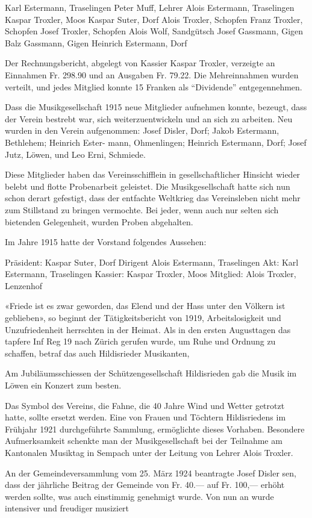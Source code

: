 \begin{multicols}{2}
    Karl Estermann, Traselingen
    Peter Muff, Lehrer
    Alois Estermann, Traselingen
    Kaspar Troxler, Moos
    Kaspar Suter, Dorf
    Alois Troxler, Schopfen
    Franz Troxler, Schopfen
    Josef Troxler, Schopfen
    Alois Wolf, Sandgütsch
    Josef Gassmann, Gigen
    Balz Gassmann, Gigen
    Heinrich Estermann, Dorf

    Der Rechnungsbericht, abgelegt von Kassier Kaspar
    Troxler, verzeigte an Einnahmen Fr. 298.90 und an
    Ausgaben Fr. 79.22. Die Mehreinnahmen wurden verteilt, und jedes Mitglied konnte 15 Franken als
    "`Dividende"' entgegennehmen.

    Dass die Musikgesellschaft 1915 neue Mitglieder aufnehmen konnte, bezeugt, dass der Verein bestrebt war,
    sich weiterzuentwickeln und an sich zu arbeiten.
    Neu wurden in den Verein aufgenommen: Josef Disler,
    Dorf; Jakob Estermann, Bethlehem; Heinrich Ester-
    mann, Ohmenlingen; Heinrich Estermann, Dorf; Josef
    Jutz, Löwen, und Leo Erni, Schmiede.

    Diese Mitglieder haben das Vereinsschifflein in gesellschaftlicher Hinsicht wieder
    belebt und flotte Probenarbeit geleistet. Die Musikgesellschaft hatte sich nun
    schon derart gefestigt, dass der entfachte Weltkrieg das
    Vereinsleben nicht mehr zum Stillstand zu bringen vermochte.
    Bei jeder, wenn auch nur selten sich bietenden
    Gelegenheit, wurden Proben abgehalten.

    Im Jahre 1915 hatte der Vorstand folgendes
    Aussehen:

    Präsident: Kaspar Suter, Dorf
    Dirigent Alois Estermann, Traselingen
    Akt: Karl Estermann, Traselingen
    Kassier: Kaspar Troxler, Moos
    Mitglied: Alois Troxler, Lenzenhof

    «Friede ist es zwar geworden, das Elend und der
    Hass unter den Völkern ist geblieben», so beginnt der
    Tätigkeitsbericht von 1919, Arbeitslosigkeit und
    Unzufriedenheit herrschten in der Heimat. Als in den
    ersten Augusttagen das tapfere Inf Reg 19 nach
    Zürich gerufen wurde, um Ruhe und Ordnung zu
    schaffen, betraf das auch Hildisrieder Musikanten,

    Am Jubiläumsschiessen der Schützengesellschaft Hildisrieden
    gab die Musik im Löwen ein Konzert zum besten.

    Das Symbol des Vereins, die Fahne, die 40 Jahre Wind
    und Wetter getrotzt hatte, sollte ersetzt werden. Eine
    von Frauen und Töchtern Hildisriedens im Frühjahr
    1921 durchgeführte Sammlung, ermöglichte dieses
    Vorhaben. Besondere Aufmerksamkeit schenkte man
    der Musikgesellschaft bei der Teilnahme am
    Kantonalen Musiktag in Sempach unter der Leitung
    von Lehrer Alois Troxler.

    An der Gemeindeversammlung vom 25. März 1924
    beantragte Josef Disler sen, dass der jährliche Beitrag
    der Gemeinde von Fr. 40.— auf Fr. 100,— erhöht
    werden sollte, was auch einstimmig genehmigt wurde.
    Von nun an wurde intensiver und freudiger musiziert


\end{multicols}
